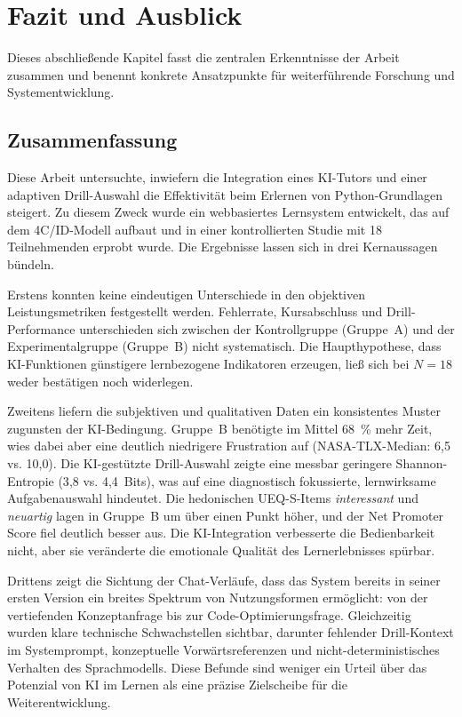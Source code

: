 \clearpage

\chapter{\textbf{Fazit und Ausblick}}\label{ch:fazit}

Dieses abschließende Kapitel fasst die zentralen Erkenntnisse der Arbeit zusammen und benennt konkrete Ansatzpunkte für weiterführende Forschung und Systementwicklung.

\section{Zusammenfassung}\label{sec:zusammenfassung}

Diese Arbeit untersuchte, inwiefern die Integration eines KI-Tutors und einer adaptiven Drill-Auswahl die Effektivität beim Erlernen von Python-Grundlagen steigert. Zu diesem Zweck wurde ein webbasiertes Lernsystem entwickelt, das auf dem 4C/ID-Modell aufbaut und in einer kontrollierten Studie mit 18 Teilnehmenden erprobt wurde. Die Ergebnisse lassen sich in drei Kernaussagen bündeln.

Erstens konnten keine eindeutigen Unterschiede in den objektiven Leistungsmetriken festgestellt werden. Fehlerrate, Kursabschluss und Drill-Performance unterschieden sich zwischen der Kontrollgruppe (Gruppe~A) und der Experimentalgruppe (Gruppe~B) nicht systematisch. Die Haupthypothese, dass KI-Funktionen günstigere lernbezogene Indikatoren erzeugen, ließ sich bei $N=18$ weder bestätigen noch widerlegen.

Zweitens liefern die subjektiven und qualitativen Daten ein konsistentes Muster zugunsten der KI-Bedingung. Gruppe~B benötigte im Mittel 68~\% mehr Zeit, wies dabei aber eine deutlich niedrigere Frustration auf (NASA-TLX-Median: 6{,}5 vs. 10{,}0). Die KI-gestützte Drill-Auswahl zeigte eine messbar geringere Shannon-Entropie (3{,}8 vs. 4{,}4~Bits), was auf eine diagnostisch fokussierte, lernwirksame Aufgabenauswahl hindeutet. Die hedonischen UEQ-S-Items \textit{interessant} und \textit{neuartig} lagen in Gruppe~B um über einen Punkt höher, und der Net Promoter Score fiel deutlich besser aus. Die KI-Integration verbesserte die Bedienbarkeit nicht, aber sie veränderte die emotionale Qualität des Lernerlebnisses spürbar.

Drittens zeigt die Sichtung der Chat-Verläufe, dass das System bereits in seiner ersten Version ein breites Spektrum von Nutzungsformen ermöglicht: von der vertiefenden Konzeptanfrage bis zur Code-Optimierungsfrage. Gleichzeitig wurden klare technische Schwachstellen sichtbar, darunter fehlender Drill-Kontext im Systemprompt, konzeptuelle Vorwärtsreferenzen und nicht-deterministisches Verhalten des Sprachmodells. Diese Befunde sind weniger ein Urteil über das Potenzial von KI im Lernen als eine präzise Zielscheibe für die Weiterentwicklung.

